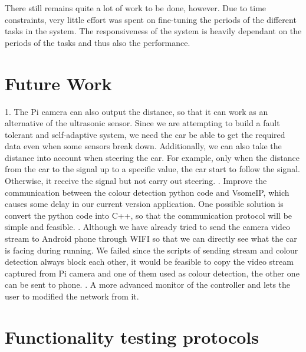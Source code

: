 \documentclass[11pt, titlepage]{article} %
\begin{document}
There still remains quite a lot of work to be done, however. Due to time constraints, very little effort was
spent on fine-tuning the periods of the different tasks in the system. The responsiveness of the system is
heavily dependant on the periods of the tasks and thus also the performance.


\clearpage
\section{Future Work}
1.	The Pi camera can also output the distance, so that it can work as an alternative of the ultrasonic sensor. Since we are attempting to build a fault tolerant and self-adaptive system, we need the car be able to get the required data even when some sensors break down. Additionally, we can also take the distance into account when steering the car. For example, only when the distance from the car to the signal up to a specific value, the car start to follow the signal. Otherwise, it receive the signal but not carry out steering.
.	Improve the communication between the colour detection python code and VsomeIP, which causes some delay in our current version application. One possible solution is convert the python code into C++, so that the communication protocol will be simple and feasible.
.	Although we have already tried to send the camera video stream to Android phone through WIFI so that we can directly see what the car is facing during running. We failed since the scripts of sending stream and colour detection always block each other, it would be feasible to copy the video stream captured from Pi camera and one of them used as colour detection, the other one can be sent to phone.
. A more advanced monitor of the controller and lets the user to modified the network from it. 
\clearpage




\clearpage
\clearpage
\appendix

\section{Functionality testing protocols}
\label{appendix:functionalityTesting}
\end{document}
